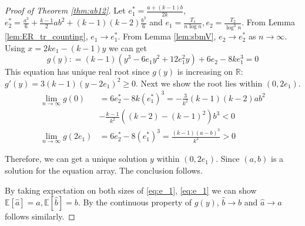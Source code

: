 \documentclass[journal]{IEEEtran}
\newcommand{\1}{\mathbbm{1}}
\begin{document}
\begin{proof}[Proof of Theorem \ref{thm:ab12}]
	Let $e^*_1 = \frac{a+(k-1)b}{2k}$, $e^*_2 = \frac{a^3}{6} + \frac{k-1}{2}ab^2 + (k-1)(k-2)\frac{b^3}{6}$
	and $e_1 = \frac{T_1}{n\log n}, e_2 = \frac{T_2}{\log^3 n}$.
	From Lemma \ref{lem:ER_tr_counting}, $e_1 \to e^*_1$.
	From Lemma \ref{lem:sbmV}, $e_2 \to e^*_2$ as $n\to \infty$.
	Using $x=2ke_1 - (k-1)y$ we can get
\begin{equation}
g(y): = (k-1)(y^3 - 6 e_1 y^2 + 12 e_1^2 y) + 6 e_2 - 8 k e_1^3 = 0
\end{equation}
This equation has unique real root since $g(y)$ is increasing on $\mathbb{R}$:  $g'(y) = 3(k-1)(y-2e_1)^2 \geq 0 $.
Next we show the root lies within $(0, 2e_1)$.
\begin{align*}
\lim_{n\to \infty}g(0) &=  6e^*_2 - 8k(e^*_1)^3 =-\frac{3}{k^2}(k-1)(k-2)ab^2 \\
 &- \frac{k-1}{k^2} ((k-2)-(k-1)^2)b^3 < 0 \\
\lim_{n\to \infty}g(2e_1) &= 6e^*_2 - 8(e^*_1)^3 = \frac{(k-1)(a-b)^3}{k^3} > 0
\end{align*}

Therefore, we can get a unique solution $y$ within $(0, 2e_1)$. Since $(a,b)$ is a solution for the equation array. The conclusion follows.

By taking expectation on both sizes of \eqref{eq:e_1}, \eqref{eq:e_1} we can show $\mathbb{E}[\hat{a}] = a,
\mathbb{E}[\hat{b}] = b$. By the continuous property of $g(y)$, $\hat{b} \to b$ and $\hat{a} \to a$ follows similarly.
\end{proof}
\end{document}
